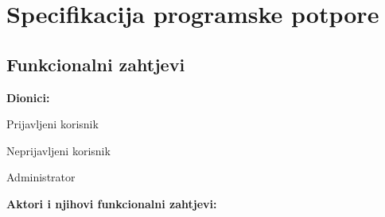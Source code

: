\chapter{Specifikacija programske potpore}
		
	\section{Funkcionalni zahtjevi}
						
			\noindent \textbf{Dionici:}
			
			\begin{packed_enum}
				
				\item Prijavljeni korisnik
				\item Neprijavljeni korisnik
				\item Administrator			
				
			\end{packed_enum}
			
			\noindent \textbf{Aktori i njihovi funkcionalni zahtjevi:}
			
